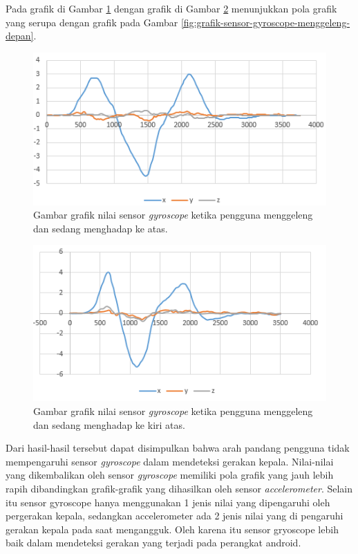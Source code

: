 Pada grafik di Gambar \ref{fig:grafik-sensor-gyroscope-menggeleng-atas} dengan grafik di Gambar \ref{fig:grafik-sensor-gyroscope-menggeleng-kiri-atas} menunjukkan pola grafik yang serupa dengan grafik pada Gambar \ref{fig:grafik-sensor-gyroscope-menggeleng-depan}.

\begin{figure}[htbp]
\centering
\includegraphics[scale=1]{Gambar/grafik-sensor-gyroscope-menggeleng-atas.png}
\caption{Gambar grafik nilai sensor \textit{gyroscope} ketika pengguna menggeleng dan sedang menghadap ke atas.} 
\label{fig:grafik-sensor-gyroscope-menggeleng-atas}
\end{figure}

\begin{figure}[htbp]
\centering
\includegraphics[scale=1]{Gambar/grafik-sensor-gyroscope-menggeleng-depan.png}
\caption{Gambar grafik nilai sensor \textit{gyroscope} ketika pengguna menggeleng dan sedang menghadap ke kiri atas.} 
\label{fig:grafik-sensor-gyroscope-menggeleng-kiri-atas}
\end{figure}

Dari hasil-hasil tersebut dapat disimpulkan bahwa arah pandang pengguna tidak mempengaruhi sensor \textit{gyroscope} dalam mendeteksi gerakan kepala. Nilai-nilai yang dikembalikan oleh sensor \textit{gyroscope} memiliki  pola grafik yang jauh lebih rapih dibandingkan grafik-grafik yang dihasilkan oleh sensor \textit{accelerometer}. Selain itu sensor gyroscope hanya menggunakan 1 jenis nilai yang dipengaruhi oleh pergerakan kepala, sedangkan accelerometer ada 2 jenis nilai yang di pengaruhi gerakan kepala pada saat mengangguk. Oleh karena itu sensor gryoscope lebih baik dalam mendeteksi gerakan yang terjadi pada perangkat android.

